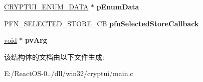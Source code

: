 \begin{DoxyCompactItemize}
\hyperlink{struct___c_r_y_p_t_u_i___e_n_u_m___d_a_t_a}{C\+R\+Y\+P\+T\+U\+I\+\_\+\+E\+N\+U\+M\+\_\+\+D\+A\+TA} $\ast$ {\bfseries p\+Enum\+Data}
\item 
\mbox{\label{struct___c_r_y_p_t_u_i___s_e_l_e_c_t_s_t_o_r_e___i_n_f_o___w_a415b5f77206f2c0553e225ffc8cc4e5a}} 
P\+F\+N\+\_\+\+S\+E\+L\+E\+C\+T\+E\+D\+\_\+\+S\+T\+O\+R\+E\+\_\+\+CB {\bfseries pfn\+Selected\+Store\+Callback}
\item 
\mbox{\label{struct___c_r_y_p_t_u_i___s_e_l_e_c_t_s_t_o_r_e___i_n_f_o___w_a8ccd538ec42c3d5ec4d0bc8c96caade3}} 
\hyperlink{interfacevoid}{void} $\ast$ {\bfseries pv\+Arg}
\end{DoxyCompactItemize}


该结构体的文档由以下文件生成\+:\begin{DoxyCompactItemize}
\item 
E\+:/\+React\+O\+S-\/0../dll/win32/cryptui/main.\+c\end{DoxyCompactItemize}
